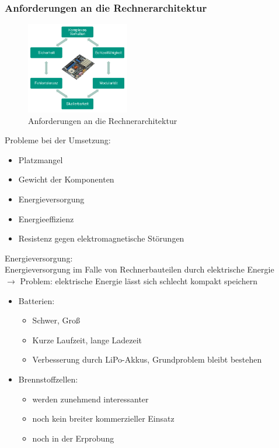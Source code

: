 \subsubsection{Anforderungen an die Rechnerarchitektur}
\begin{figure}[h!]
	\centering
	\includegraphics[width=0.4\textwidth]{figures/ch07_arch.png}
	\caption{Anforderungen an die Rechnerarchitektur}
	\label{arch}
\end{figure}
Probleme bei der Umsetzung:
\begin{itemize}
\item Platzmangel
\item Gewicht der Komponenten
\item Energieversorgung
\item Energieeffizienz
\item Resistenz gegen elektromagnetische Störungen
\end{itemize}
Energieversorgung:\\
Energieversorgung im Falle von Rechnerbauteilen durch elektrische Energie\\
$\rightarrow$ Problem: elektrische Energie lässt sich schlecht kompakt speichern
\begin{itemize}
\item Batterien:
\begin{itemize}
\item  Schwer, Groß
\item Kurze Laufzeit, lange Ladezeit
\item Verbesserung durch LiPo-Akkus, Grundproblem bleibt bestehen
\end{itemize}
\item Brennstoffzellen:
\begin{itemize}
\item werden zunehmend interessanter
\item noch kein breiter kommerzieller Einsatz
\item noch in der Erprobung
\end{itemize}
\end{itemize}
